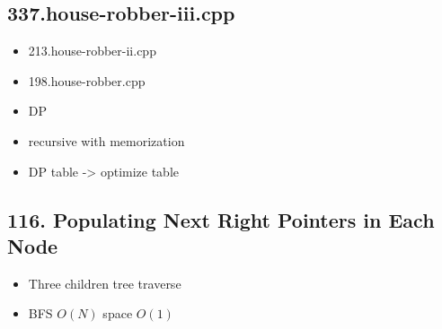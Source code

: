 \subsection{337.house-robber-iii.cpp}
\begin{itemize}

	\item 213.house-robber-ii.cpp
	\item 198.house-robber.cpp
	\item DP
	\item recursive with memorization
	\item DP table -> optimize table
\end{itemize}

\subsection{116. Populating Next Right Pointers in Each Node}

\begin{itemize}
	\item Three children tree traverse
	\item BFS \(O\left(N\right)\)  space \(O\left(1\right)\)
\end{itemize}
